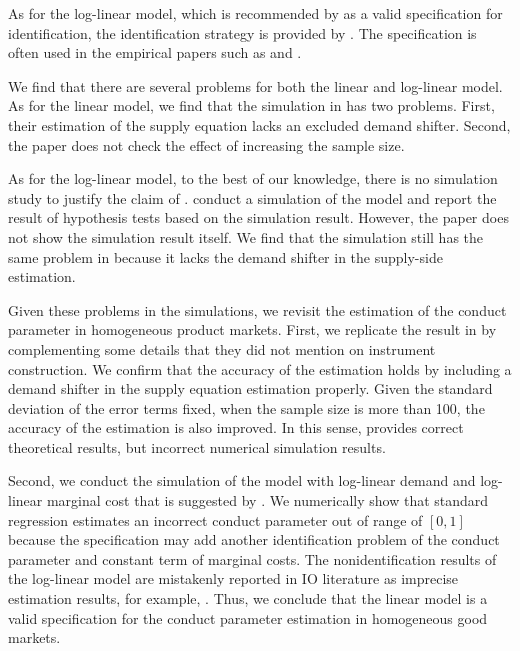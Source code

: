 \documentclass[11pt, a4paper]{article}
\begin{document}
As for the log-linear model, which is recommended by \cite{perloff2012collinearity} as a valid specification for identification, the identification strategy is provided by \citet{lau1982identifying}. The specification is often used in the empirical papers such as \cite{okazaki2022excess} and \cite{merel2009measuring}.

We find that there are several problems for both the linear and log-linear model.
As for the linear model, we find that the simulation in \cite{perloff2012collinearity} has two problems.
First, their estimation of the supply equation lacks an excluded demand shifter.
Second, the paper does not check the effect of increasing the sample size. 

As for the log-linear model, to the best of our knowledge, there is no simulation study to justify the claim of \cite{perloff2012collinearity}.
\cite{hyde1995can} conduct a simulation of the model and report the result of hypothesis tests based on the simulation result. 
However, the paper does not show the simulation result itself. 
We find that the simulation still has the same problem in \cite{perloff2012collinearity} because it lacks the demand shifter in the supply-side estimation.

Given these problems in the simulations, we revisit the estimation of the conduct parameter in homogeneous product markets.
First, we replicate the result in \cite{perloff2012collinearity} by complementing some details that they did not mention on instrument construction. 
We confirm that the accuracy of the estimation holds by including a demand shifter in the supply equation estimation properly. 
Given the standard deviation of the error terms fixed, when the sample size is more than 100, the accuracy of the estimation is also improved.
In this sense, \cite{perloff2012collinearity} provides correct theoretical results, but incorrect numerical simulation results.

Second, we conduct the simulation of the model with log-linear demand and log-linear marginal cost that is suggested by \cite{perloff2012collinearity}. 
We numerically show that standard regression estimates an incorrect conduct parameter out of range of $[0,1]$ because the specification may add another identification problem of the conduct parameter and constant term of marginal costs. 
The nonidentification results of the log-linear model are mistakenly reported in IO literature as imprecise estimation results, for example, \cite{okazaki2022excess}. 
Thus, we conclude that the linear model is a valid specification for the conduct parameter estimation in homogeneous good markets.
\end{document}
